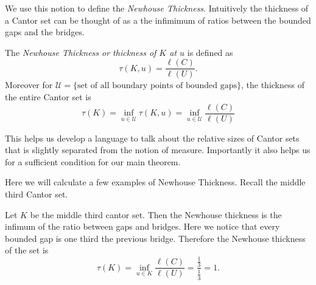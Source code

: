 \vspace*{0.25cm}
{}

We use this notion to define the \textit{Newhouse Thickness}.  Intuitively the thickness of a Cantor set can be thought of as a the infimimum of ratios between the bounded gaps and the bridges.  
\begin{definition}
    The \textit{Newhouse Thickness or thickness of $K$ at $u$} is defined as
    $$\tau(K, u) = \frac{\ell(C)}{\ell(U)}.$$
    Moreover for $\mathcal{U} = \{ \text{set of all boundary points of bounded gaps}\}$, the thickness of the entire Cantor set is 
    $$\tau(K) = \inf_{u\in \mathcal{U}} \tau(K, u) = \inf_{u\in \mathcal{U}}\frac{\ell(C)}{\ell(U)}$$
\end{definition}
This helps us develop a language to talk about the relative sizes of Cantor sets that is slightly separated from the notion of measure.  Importantly it also helps us for a sufficient condition for our main theorem.

Here we will calculate a few examples of Newhouse Thickness.  Recall the middle third Cantor set.  
\begin{example}
    Let $K$ be the middle third cantor set.  Then the Newhouse thickness is the infimum of the ratio between gaps and bridges.  Here we notice that every bounded gap is one third the previous bridge.  Therefore the Newhouse thickness of the set is 
    $$\tau(K) = \inf_{u\in K}\frac{\ell(C)}{\ell(U)} = \frac{\frac{1}{3}}{\frac{1}{3}} = 1.$$
\end{example}

